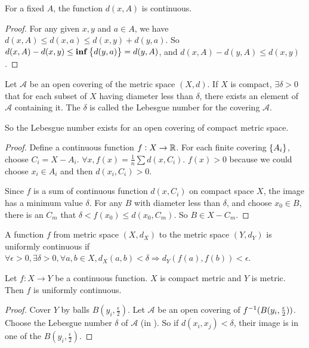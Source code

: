 \begin{theorem}
    For a fixed $A$, the function $d(x,A)$ is continuous.
\end{theorem}
\begin{proof}
    For any given $x,y$ and $a \in A$, we have $d(x,A) \leq d(x,a) \leq d(x,y) + d(y,a)$. So $d(x,A) - d(x,y) \leq \mathbf{inf} \set{d(y,a)} = d(y,A)$, and $d(x,A) - d(y,A) \leq d(x,y)$.
\end{proof}


\begin{theorem}\label{lebesgue_number}
    Let $\mathcal{A}$ be an open covering of the metric space $(X, d)$. If $X$ is compact, $\exists \delta > 0$ that for each subset of $X$ having diameter less than $\delta$, there exists an element of $\mathcal{A}$ containing it. The $\delta$ is called the Lebesgue number for the covering $\mathcal{A}$.
    
    So the Lebesgue number exists for an open covering of compact metric space.
\end{theorem}
\begin{proof}
    Define a continuous function $f : X \rightarrow \mathbb{R}$. For each finite covering $\set{A_i}$, choose $C_i = X - A_i$. $\displaystyle \forall x, f(x) = \frac{1}{n} \sum d(x,C_i)$. $f(x) > 0$ because we could choose $x_i \in A_i$ and then $d(x_i, C_i) > 0$.
    
     Since $f$ is a sum of continuous function $d(x,C_i)$ on compact space $X$, the image has a minimum value $\delta$. For any $B$ with diameter less than $\delta$, and choose $x_0 \in B$, there is an $C_m$ that $\delta < f(x_0) \leq d(x_0, C_m)$. So $B \in X - C_m$.
\end{proof}

\begin{definition}
    A function $f$ from metric space $(X, d_X)$ to the metric space $(Y, d_Y)$ is uniformly continuous if $\forall \epsilon > 0, \exists \delta > 0, \forall a,b \in X, d_X (a,b) < \delta \Rightarrow d_Y \left(f(a), f(b)\right) < \epsilon$.
\end{definition}

\begin{theorem}
    Let $f: X \rightarrow Y$ be a continuous function. $X$ is compact metric and $Y$ is metric. Then $f$ is uniformly continuous.    
\end{theorem}
\begin{proof}
    Cover $Y$ by balls $B(y_i, \frac{\epsilon}{2})$. Let $\mathcal{A}$ be an open covering of ${f}^{-1}(B(y_i, \frac{\epsilon}{2}))$. Choose the Lebesgue number $\delta$ of $\mathcal{A}$ (in ). So if $d(x_i, x_j) < \delta$, their image is in one of the $B(y_i, \frac{\epsilon}{2})$.
\end{proof}




